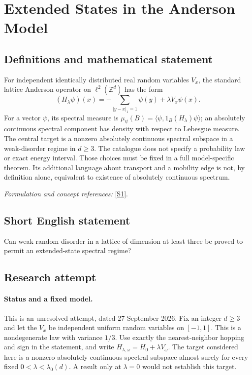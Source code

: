 \documentclass[11pt]{article}
\begin{document}
\section*{\texorpdfstring{Extended States in the Anderson Model}{Extended States in the Anderson Model}}\label{statement}
\subsection{Definitions and mathematical statement}
For independent identically distributed real random variables $V_x$, the standard lattice Anderson operator on $\ell^2({\mathbb{Z}}^d)$ has the form
\[
 (H_\lambda\psi)(x)=-\sum_{|y-x|_1=1}\psi(y)+\lambda V_x\psi(x).
\]
For a vector $\psi$, its spectral measure is $\mu_\psi(B)=\langle\psi,1_B(H_\lambda)\psi\rangle$; an absolutely continuous spectral component has density with respect to Lebesgue measure. The central target is a nonzero absolutely continuous spectral subspace in a weak-disorder regime in $d\ge3$. The catalogue does not specify a probability law or exact energy interval. Those choices must be fixed in a full model-specific theorem. Its additional language about transport and a mobility edge is not, by definition alone, equivalent to existence of absolutely continuous spectrum.
\par\smallskip\textit{Formulation and concept references:} \href{https://arxiv.org/abs/0709.3707}{[S1]}.

\subsection{Short English statement}
Can weak random disorder in a lattice of dimension at least three be proved to permit an extended-state spectral regime?
\subsection{Research attempt}
\paragraph{Status and a fixed model.}
This is an unresolved attempt, dated 27 September 2026. Fix an integer
$d\geq3$ and let the $V_x$ be independent uniform random variables on
$[-1,1]$. This is a nondegenerate law with variance $1/3$. Use exactly the
nearest-neighbor hopping and sign in the statement, and write
$H_{\lambda,\omega}=H_0+\lambda V_\omega$. The target considered here is a
nonzero absolutely continuous spectral subspace almost surely for every
fixed $0<\lambda<\lambda_0(d)$. A result only at $\lambda=0$ would not
establish this target.
\end{document}
